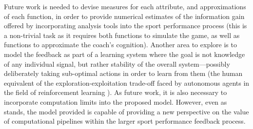 
Future work is needed to devise measures for each attribute, and
approximations of each function, in order to provide numerical
estimates of the information gain offered by incorporating analysis tools into the sport performance process (this is a non-trivial task as it requires both functions to
simulate the game, as well as functions to approximate the coach's
cognition). Another area to explore is to model the feedback
as part of a learning system where the goal is not knowledge of any
individual signal, but rather stability of the overall system---possibly deliberately taking sub-optimal actions in order to learn from them (the human equivalent of the exploration-exploitation trade-off faced by autonomous agents in the field of reinforcement learning \cite{sutton1998reinforcement}). As future work, it is also necessary to incorporate computation limits into the proposed model. However, even as stands, the model provided is capable of providing a new
perspective on the value of computational pipelines within the larger sport performance feedback process.
